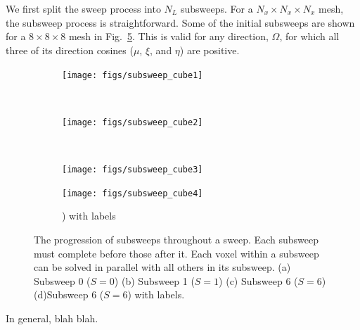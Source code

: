 We first split the sweep process into $N_L$ subsweeps. For a $N_x \times N_x \times N_x$ mesh, the subsweep process is straightforward. Some of the initial subsweeps are shown for a $8 \times 8 \times 8$ mesh in Fig.~\ref{fig:subsweep_cube}. This is valid for any direction, $\hat{\Omega}$, for which all three of its direction cosines ($\mu$, $\xi$, and $\eta$) are positive.

\begin{figure}
    \centering
    \begin{subfigure}[b]{0.45\textwidth}
        \texttt{[image: figs/subsweep\_cube1]}
        \caption{}
        \label{fig:subsweep_cube1}
    \end{subfigure}
    ~ 
    \begin{subfigure}[b]{0.45\textwidth}
        \texttt{[image: figs/subsweep\_cube2]}
        \caption{}
        \label{fig:subsweep_cube2}
    \end{subfigure}
    ~ 
    \begin{subfigure}[b]{0.45\textwidth}
        \texttt{[image: figs/subsweep\_cube3]}
        \caption{}
        \label{fig:subsweep_cube3}
    \end{subfigure}
    \begin{subfigure}[b]{0.45\textwidth}
        \texttt{[image: figs/subsweep\_cube4]}
        \caption{) with labels}
        \label{fig:subsweep_cube4}
    \end{subfigure}
    \caption{The progression of subsweeps throughout a sweep. Each subsweep must complete before those after it. Each voxel within a subsweep can be solved in parallel with all others in its subsweep. (a) Subsweep 0 ($S=0$) (b) Subsweep 1 ($S=1$) (c) Subsweep 6 ($S=6$) (d)Subsweep 6 ($S=6$) with labels.}\label{fig:subsweep_cube}
\end{figure}

In general, blah blah.

